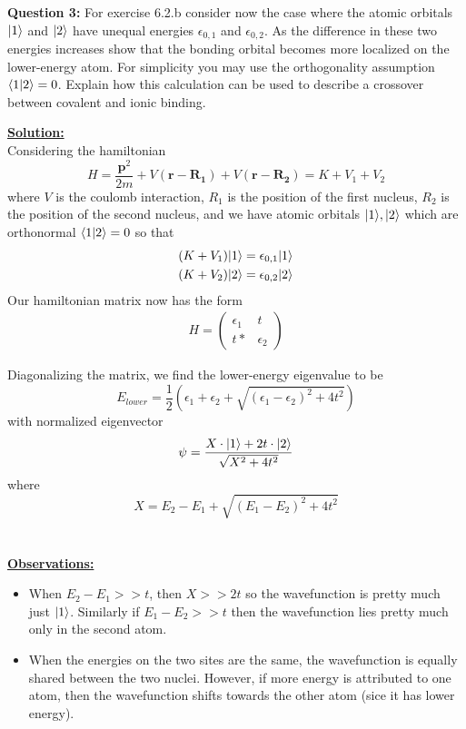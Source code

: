 \documentclass[11pt]{article}
\begin{document}
\begin{bluebox}
  \textbf{Question 3:} For exercise 6.2.b consider now the case where the atomic orbitals $\lvert1\rangle$ and $\lvert2\rangle$ have unequal energies $\epsilon_{0,1}$ and $\epsilon_{0,2}$. As the difference in these two energies increases show that the bonding orbital becomes more localized on the lower-energy atom. For simplicity you may use the orthogonality assumption $\langle 1 | 2 \rangle = 0$. Explain how this calculation can be used to describe a crossover between covalent and ionic binding.
\end{bluebox}

\vskip 0.5cm
\textbf{\underline{Solution:}}
\\
Considering the hamiltonian $$ H = \frac{\mathbf{p}^2}{2m} + V(\mathbf{r} - \mathbf{R_1}) + V(\mathbf{r} - \mathbf{R_2}) = K + V_1 + V_2 $$ where $V$ is the coulomb interaction, $R_1$ is the position of the first nucleus, $R_2$ is the position of the second nucleus, and we have atomic orbitals $\lvert1\rangle, \lvert2\rangle$ which are orthonormal $\langle 1 | 2 \rangle = 0$ so that 
\begin{align*}
  (K + V_1)\lvert1\rangle &= \epsilon_{0, 1} \lvert1\rangle \\
  (K + V_2)\lvert2\rangle &= \epsilon_{0, 2} \lvert2\rangle \\
\end{align*} Our hamiltonian matrix now has the form 
\begin{align*}
  H = \begin{pmatrix}
    \epsilon_1 & t \\
    t* & \epsilon_2
  \end{pmatrix}
\end{align*}

Diagonalizing the matrix, we find the lower-energy eigenvalue to be $$ E_{lower} = \frac{1}{2} \left( \epsilon_1 + \epsilon_2 + \sqrt{(\epsilon_1 - \epsilon_2)^2 + 4t^2} \right) $$ with normalized eigenvector $$ \psi = \frac{X \cdot \lvert1\rangle + 2t \cdot \lvert2\rangle}{\sqrt{X^2 + 4t^2}} $$ where $$ X = E_2 - E_1 + \sqrt{(E_1 - E_2)^2 + 4t^2} $$ \\
\\
\textbf{\underline{Observations:}}
\begin{itemize}
  \item When $E_2 - E_1 >> t$, then $X >> 2t$ so the wavefunction is pretty much just $\lvert1\rangle$. Similarly if $E_1 - E_2 >> t$ then the wavefunction lies pretty much only in the second atom.
  \item When the energies on the two sites are the same, the wavefunction is equally shared between the two nuclei. However, if more energy is attributed to one atom, then the wavefunction shifts towards the other atom (sice it has lower energy).
\end{itemize}
\end{document}
